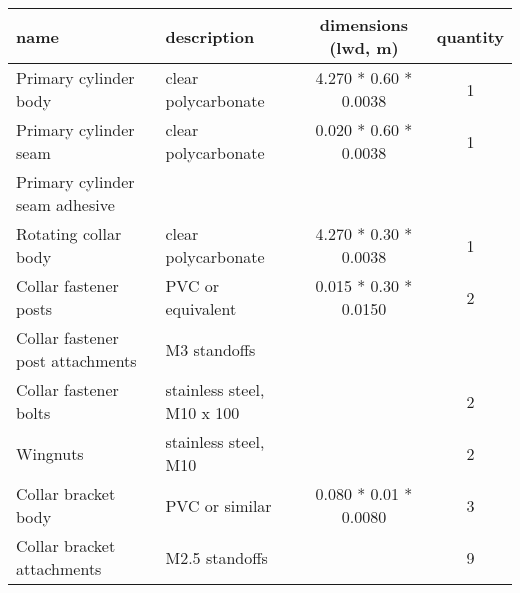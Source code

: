 \documentclass[standalone]{article}
\begin{document}
\centering
\begin{tabular}{llcc}
\textbf{name} & \textbf{description} & \textbf{dimensions (lwd, m)} & \textbf{quantity} \\ 
\hline
Primary cylinder body & clear polycarbonate & 4.270 * 0.60 * 0.0038 & 1 \\
Primary cylinder seam & clear polycarbonate & 0.020 * 0.60 * 0.0038 & 1 \\
Primary cylinder seam adhesive &            & & \\
Rotating collar body & clear polycarbonate  & 4.270 * 0.30 * 0.0038 & 1 \\
Collar fastener posts & PVC or equivalent   & 0.015 * 0.30 * 0.0150 & 2 \\
Collar fastener post attachments & M3 standoffs & & \\
Collar fastener bolts & stainless steel, M10 x 100 & & 2 \\
Wingnuts & stainless steel, M10 & & 2 \\
Collar bracket body & PVC or similar        & 0.080 * 0.01 * 0.0080 & 3 \\
Collar bracket attachments & M2.5 standoffs & & 9 \\
\end{tabular}
\end{document}
